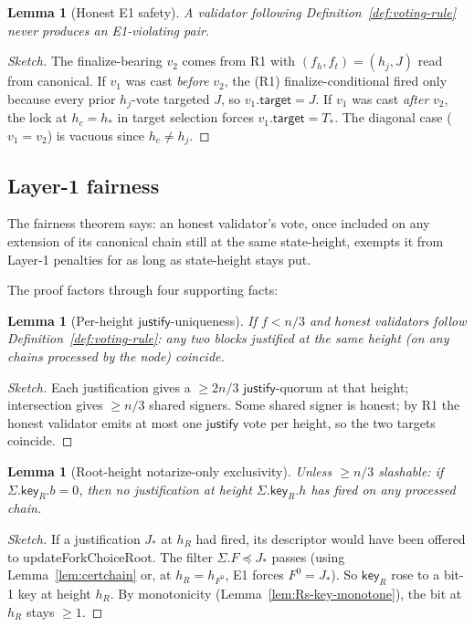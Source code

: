 \documentclass{article}
\newcommand{\target}{\mathsf{target}}
\newcommand{\just}{\ensuremath{\mathsf{justify}}\xspace}
\newcommand{\key}{\mathsf{key}}
\newcommand{\updateForkChoiceRoot}{\textsf{updateForkChoiceRoot}\xspace}
\theoremstyle{plain}
\newtheorem{lemma}[theorem]{Lemma}
\theoremstyle{definition}
\theoremstyle{remark}
\begin{document}
\begin{lemma}[Honest E1 safety]\label{lem:honest-e1}
A validator following Definition~\ref{def:voting-rule} never produces an E1-violating pair.
\end{lemma}

\begin{proof}[Sketch]
The finalize-bearing $v_2$ comes from R1 with $(f_h, f_t) = (h_j, J)$ read from canonical. If $v_1$ was cast \emph{before} $v_2$, the (R1) finalize-conditional fired only because every prior $h_j$-vote targeted $J$, so $v_1.\target = J$. If $v_1$ was cast \emph{after} $v_2$, the lock at $h_c = h_*$ in target selection forces $v_1.\target = T_*$. The diagonal case ($v_1 = v_2$) is vacuous since $h_c \neq h_j$.
\end{proof}

\subsection{Layer-1 fairness}

The fairness theorem says: an honest validator's vote, once included on any extension of its canonical chain still at the same state-height, exempts it from Layer-1 penalties for as long as state-height stays put.

The proof factors through four supporting facts:

\begin{lemma}[Per-height \just{}-uniqueness]\label{lem:just-unique-height}
If $f < n/3$ and honest validators follow Definition~\ref{def:voting-rule}: any two blocks justified at the same height (on any chains processed by the node) coincide.
\end{lemma}

\begin{proof}[Sketch] Each justification gives a $\geq 2n/3$ \just{}-quorum at that height; intersection gives $\geq n/3$ shared signers. Some shared signer is honest; by R1 the honest validator emits at most one \just{} vote per height, so the two targets coincide. \end{proof}

\begin{lemma}[Root-height notarize-only exclusivity]\label{lem:root-h-notarize-only}
Unless $\geq n/3$ slashable: if $\Sigma.\key_R.b = 0$, then no justification at height $\Sigma.\key_R.h$ has fired on any processed chain.
\end{lemma}

\begin{proof}[Sketch] If a justification $J_*$ at $h_R$ had fired, its descriptor would have been offered to \updateForkChoiceRoot. The filter $\Sigma.F \preceq J_*$ passes (using Lemma~\ref{lem:certchain} or, at $h_R = h_{F^0}$, E1 forces $F^0 = J_*$). So $\key_R$ rose to a bit-1 key at height $h_R$. By monotonicity (Lemma~\ref{lem:Rs-key-monotone}), the bit at $h_R$ stays $\geq 1$. \end{proof}
\end{document}

